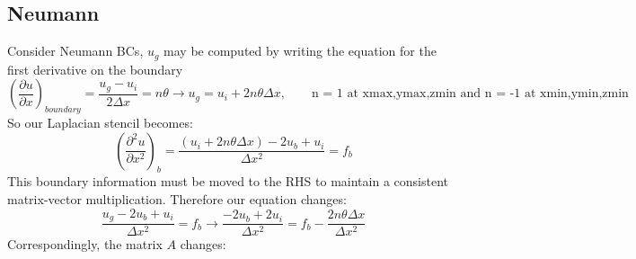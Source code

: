 \documentclass[landscape]{article}
\begin{document}
\subsection{Neumann}
Consider Neumann BCs, $u_g$ may be computed by writing the equation for the first derivative on the boundary
\begin{equation}
  \left(\frac{\partial u}{\partial x}\right)_{boundary}
  = \frac{u_g - u_i}{2\Delta x} = n \theta
  \rightarrow
  u_g = u_i + 2 n\theta \Delta x, \qquad \text{n = 1 at xmax,ymax,zmin and n = -1 at xmin,ymin,zmin}
\end{equation}
So our Laplacian stencil becomes:
\begin{equation}
   \left(\frac{\partial^2 u}{\partial x^2}\right)_{b} =
   \frac{(u_i + 2 n \theta \Delta x) - 2 u_b + u_i}{\Delta x^2} = f_b
\end{equation}
This boundary information must be moved to the RHS to maintain a consistent matrix-vector multiplication. Therefore our equation changes:
\begin{equation}
   \frac{u_g - 2 u_b + u_i}{\Delta x^2} = f_b
   \rightarrow
   \frac{- 2u_b + 2u_i}{\Delta x^2} = f_b - \frac{2 n\theta \Delta x}{\Delta x^2}
\end{equation}
Correspondingly, the matrix $A$ changes:
\end{document}
